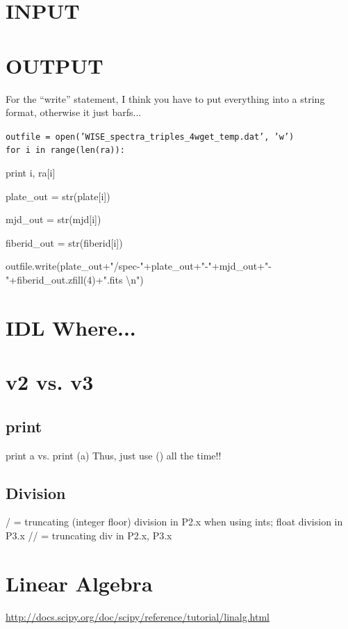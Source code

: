 \documentclass[11pt,a4paper]{article}
\begin{document}
\section{INPUT}


\section{OUTPUT}
For the ``write'' statement, I think you have to put everything into 
a string format, otherwise it just barfs... \\

\noindent
{\tt  outfile = open('WISE\_spectra\_triples\_4wget\_temp.dat', 'w') \\
for i in range(len(ra)): 

    print i, ra[i] 

    plate\_out = str(plate[i])

    mjd\_out = str(mjd[i]) 

    fiberid\_out = str(fiberid[i])

    outfile.write(plate\_out+"/spec-"+plate\_out+"-"+mjd\_out+"-"+fiberid\_out.zfill(4)+".fits \textbackslash n")
}







\section{IDL Where...}


\section{v2 vs. v3}
\subsection{print}
print a vs. print (a)
Thus, just use () all the time!!

\subsection{Division}
/ = truncating (integer floor) division in P2.x when using ints; float division in P3.x
// = truncating div in P2.x, P3.x 



\section{Linear Algebra}
\href{http://docs.scipy.org/doc/scipy/reference/tutorial/linalg.html}{http://docs.scipy.org/doc/scipy/reference/tutorial/linalg.html}
\end{document}
